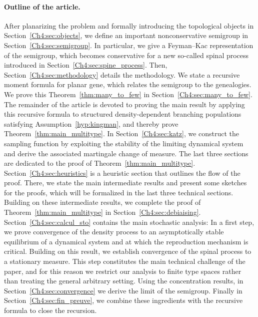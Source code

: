 \begin{refsegment}
\paragraph{Outline of the article.} 
After planarizing the problem and formally introducing the topological objects in Section~\ref{Ch4:sec:objects}, we define an important nonconservative semigroup in Section~\ref{Ch4:sec:semigroup}. In particular, we give a Feyman--Kac representation of the semigroup, which becomes conservative for a new so-called spinal process introduced in Section~\ref{Ch4:sec:spine_process}.
 Then, Section~\ref{Ch4:sec:methodology} details the methodology. We state a recursive moment formula for planar gene, which relates the semigroup to the genealogies. We prove this Theorem~\ref{thm:many_to_few} in Section~\ref{Ch4:sec:many_to_few}. The remainder of the article is devoted to proving the main result by applying this recursive formula to structured density-dependent branching populations satisfying Assumption~\ref{hyp:kingman}, and thereby prove Theorem~\ref{thm:main_multitype}.
In Section~\ref{Ch4:sec:katz}, we construct the sampling function by exploiting the stability of the limiting dynamical system and derive the associated martingale change of measure.
The last three sections are dedicated to the proof of Theorem~\ref{thm:main_multitype}.
Section~\ref{Ch4:sec:heuristics} is a heuristic section that outlines the flow of the proof.  There, we state the main intermediate results and present some sketches for the proofs, which will be formalized in the last three technical sections. Building on these intermediate results, we complete the proof of Theorem~\ref{thm:main_multitype} in Section~\ref{Ch4:sec:debiaising}.
 Section~\ref{Ch4:sec:calcul_sto} contains the main stochastic analysis: In a first step, we prove convergence of the density process to an asymptotically stable equilibrium of a dynamical system and at which the reproduction mechanism is critical. Building on this result, we establish convergence of the spinal process to a stationary measure. This step constitutes the main technical challenge of the paper, and for this reason we restrict our analysis to finite type spaces rather than treating the general arbitrary setting.
Using the concentration results, in Section~\ref{Ch4:sec:convergence} we derive the limit of the semigroup. Finally in Section~\ref{Ch4:sec:fin_preuve}, we combine these ingredients with the recursive formula to close the recursion.

\end{refsegment}
